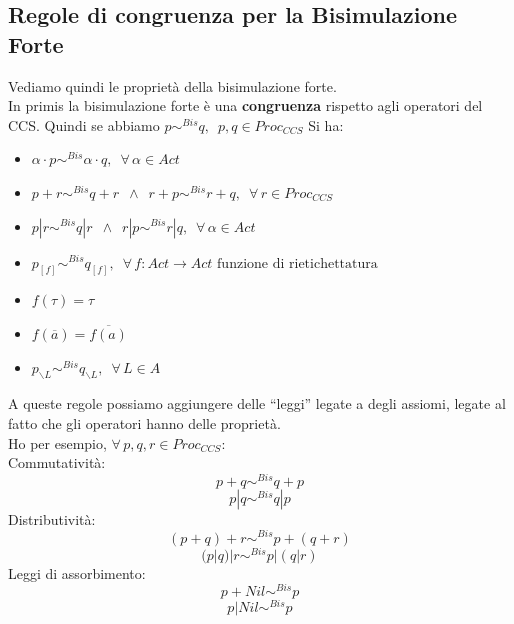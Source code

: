\subsection{Regole di congruenza per la Bisimulazione Forte}
Vediamo quindi le proprietà della bisimulazione forte.\\
In primis la bisimulazione forte è una \textbf{congruenza} rispetto agli
operatori del CCS. Quindi se abbiamo $p\sim^{Bis}q,\,\,\, p, q\in Proc_{CCS}$ Si ha:
\begin{itemize}
    \item $\alpha\cdot p\sim^{Bis} \alpha\cdot q,\,\,\,\forall\,\alpha\in Act$
    \item $p+r\sim^{Bis}q+r\,\,\,\land\,\,\,r+p\sim^{Bis} r+q,\,\,\,\forall\, r\in Proc_{CCS}$
    \item $p|r\sim^{Bis}q|r\,\,\,\land \,\,\, r|p\sim^{Bis}r|q,\,\,\,\forall\,\alpha\in
  Act$
\item $p_{[f]}\sim^{Bis}q_{[f]},\,\,\,\forall\, f:Act\to Act \mbox{ funzione di
    rietichettatura}$
    
  \item $f(\tau)=\tau$
  \item $f(\overline{a})=\overline{f(a)}$
  \item $p_{\backslash L}\sim^{Bis}q_{\backslash L},\,\,\,\forall\, L\in A$
\end{itemize}
A queste regole possiamo aggiungere delle ``leggi'' legate a degli assiomi,
legate al fatto che gli operatori hanno delle proprietà.\\
Ho per esempio, $\forall\, p, q, r\in Proc_{CCS}$:\\
Commutatività:
\[p+q\sim^{Bis}q+p\]
\[p|q\sim^{Bis}q|p\]
Distributività:
\[(p+q)+r\sim^{Bis}p+(q+r)\]
\[(p|q)|r\sim^{Bis} p|(q|r)\]
Leggi di assorbimento:
\[p+Nil\sim^{Bis} p\]
\[p|Nil\sim^{Bis} p\]
